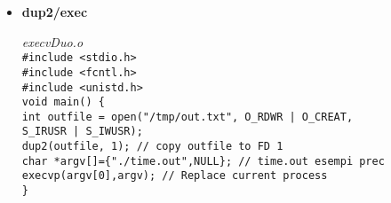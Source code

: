 \begin{flushleft}
\begin{flushleft}
\begin{flushleft}
\begin{flushleft}
\begin{itemize}
                \textit{execle2.out} \\
                \texttt{\#include <stdio.h> \\
                        \#include <stdlib.h>\\
                        void main(int argc, char ** argv)\{ \\
                        \halftab printf("This is execle2 with par:\%s and \%s. \\ \tab CIAO =
                                  \%s\n",argv[0],argv[1],getenv("CIAO")); \\
                        \}} 
          \item \textbf{dup2/exec} \par 
                \textit{execvDuo.o} \\
                \texttt{\#include <stdio.h> \\
                        \#include <fcntl.h> \\
                        \#include <unistd.h>\\
                        void main() \{ \\
                        \halftab int outfile = open("/tmp/out.txt",
                        O\_RDWR | O\_CREAT, \\ \tab \tab \tab \tab S\_IRUSR | S\_IWUSR); \\
                        \halftab dup2(outfile, 1); // copy outfile to FD 1 \\
                        \halftab char *argv[]=\{"./time.out",NULL\}; // time.out esempi prec \\
                        \halftab execvp(argv[0],argv); // Replace current process\\
                        \}} 
        \end{itemize}
      \end{flushleft}


\end{flushleft}
\end{flushleft}
\end{flushleft}
